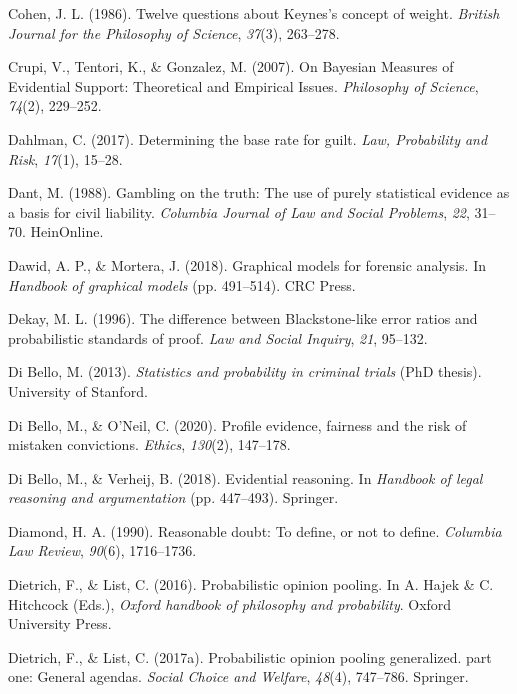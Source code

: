 \documentclass[11pt,dvipsnames,enabledeprecatedfontcommands]{scrartcl}
\begin{document}
\hypertarget{ref-cohen86}{}
Cohen, J. L. (1986). Twelve questions about Keynes's concept of weight.
\emph{British Journal for the Philosophy of Science}, \emph{37}(3),
263--278.

\hypertarget{ref-crupi2007BayesianMeasuresEvidential}{}
Crupi, V., Tentori, K., \& Gonzalez, M. (2007). On Bayesian Measures of
Evidential Support: Theoretical and Empirical Issues. \emph{Philosophy
of Science}, \emph{74}(2), 229--252.

\hypertarget{ref-dahlman2017}{}
Dahlman, C. (2017). Determining the base rate for guilt. \emph{Law,
Probability and Risk}, \emph{17}(1), 15--28.

\hypertarget{ref-dant1988gambling}{}
Dant, M. (1988). Gambling on the truth: The use of purely statistical
evidence as a basis for civil liability. \emph{Columbia Journal of Law
and Social Problems}, \emph{22}, 31--70. HeinOnline.

\hypertarget{ref-dawid2018graphical}{}
Dawid, A. P., \& Mortera, J. (2018). Graphical models for forensic
analysis. In \emph{Handbook of graphical models} (pp. 491--514). CRC
Press.

\hypertarget{ref-Dekay1996}{}
Dekay, M. L. (1996). The difference between Blackstone-like error ratios
and probabilistic standards of proof. \emph{Law and Social Inquiry},
\emph{21}, 95--132.

\hypertarget{ref-di2013statistics}{}
Di Bello, M. (2013). \emph{Statistics and probability in criminal
trials} (PhD thesis). University of Stanford.

\hypertarget{ref-DiBelloONeil2020}{}
Di Bello, M., \& O'Neil, C. (2020). Profile evidence, fairness and the
risk of mistaken convictions. \emph{Ethics}, \emph{130}(2), 147--178.

\hypertarget{ref-di2018evidential}{}
Di Bello, M., \& Verheij, B. (2018). Evidential reasoning. In
\emph{Handbook of legal reasoning and argumentation} (pp. 447--493).
Springer.

\hypertarget{ref-diamond90}{}
Diamond, H. A. (1990). Reasonable doubt: To define, or not to define.
\emph{Columbia Law Review}, \emph{90}(6), 1716--1736.

\hypertarget{ref-Dietrich2016Probabilistic}{}
Dietrich, F., \& List, C. (2016). Probabilistic opinion pooling. In A.
Hajek \& C. Hitchcock (Eds.), \emph{Oxford handbook of philosophy and
probability}. Oxford University Press.

\hypertarget{ref-dietrich2017probabilistic1}{}
Dietrich, F., \& List, C. (2017a). Probabilistic opinion pooling
generalized. part one: General agendas. \emph{Social Choice and
Welfare}, \emph{48}(4), 747--786. Springer.
\end{document}
